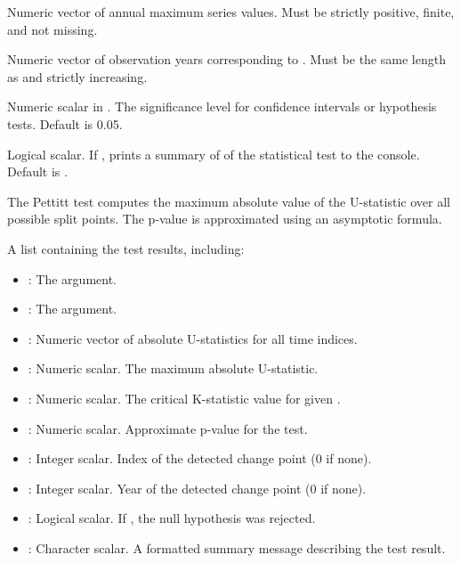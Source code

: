 \documentclass[a4paper]{book}
\begin{document}
%
\begin{Arguments}
\begin{ldescription}
\item[\code{data}] Numeric vector of annual maximum series values.
Must be strictly positive, finite, and not missing.

\item[\code{years}] Numeric vector of observation years corresponding to .
Must be the same length as  and strictly increasing.

\item[\code{alpha}] Numeric scalar in \eqn{[0.01, 0.1]}{}. The significance
level for confidence intervals or hypothesis tests. Default is 0.05.

\item[\code{quiet}] Logical scalar. If , prints a summary of of the statistical
test to the console. Default is .
\end{ldescription}
\end{Arguments}
%
\begin{Details}
The Pettitt test computes the maximum absolute value of the U-statistic
over all possible split points. The p-value is approximated using an
asymptotic formula.
\end{Details}
%
\begin{Value}
A list containing the test results, including:
\begin{itemize}

\item{} : The  argument.
\item{} : The  argument.
\item{} : Numeric vector of absolute U-statistics for all time indices.
\item{} : Numeric scalar. The maximum absolute U-statistic.
\item{} : Numeric scalar. The critical K-statistic value for given .
\item{} : Numeric scalar. Approximate p-value for the test.
\item{} : Integer scalar. Index of the detected change point (0 if none).
\item{} : Integer scalar. Year of the detected change point (0 if none).
\item{} : Logical scalar. If , the null hypothesis was rejected.
\item{} : Character scalar. A formatted summary message describing the test result.

\end{itemize}

\end{Value}
\end{document}
